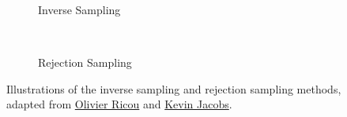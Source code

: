 \begin{figure}[H]
  \centering

  \begin{subfigure}[b]{0.48\textwidth}\centering
    \usebox{\largestimage}
    \vspace{0.01cm}
  \caption{Inverse Sampling}
  \label{fig:stats:sampling_prob_dist:inverse}
  \end{subfigure}
  ~
  \begin{subfigure}[b]{\wd\largestimage}\centering
  \caption{Rejection Sampling}
  \label{fig:stats:sampling_prob_dist:reject}
  \end{subfigure}
\caption{
Illustrations of the inverse sampling and rejection sampling methods, adapted from \href{https://en.wikipedia.org/wiki/File:Inverse_transform_sampling.png}{Olivier Ricou} and \href{https://www.data-blogger.com/2016/01/24/the-mathematics-behind-rejection-sampling/}{Kevin Jacobs}.
  \label{fig:stats:sampling_prob_distr}
}
\end{figure}

